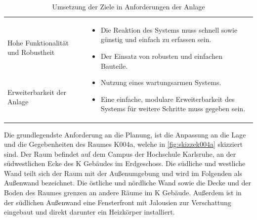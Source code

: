 \begin{table}[H]
\begin{tabularx}{1\textwidth}{m{}m{}}
& \multirow{3}{\hsize}{
\begin{minipage}[t]{0.57\textwidth}
\begin{itemize}[itemsep=0pt,topsep=0pt,leftmargin=5mm]
\item Die Reaktion des Systems muss schnell sowie günstig und einfach zu erfassen sein.
\item Der Einsatz von robusten und einfachen Bauteile.
\item Nutzung eines wartungsarmen Systems.
\item Eine einfache, modulare Erweiterbarkeit des Systems für weitere Schritte muss gegeben sein.
\end{itemize}
\end{minipage}
}  \\

\cmidrule[0.1pt](lr{2em}){1-1} 

Hohe Funktionalität und \newline Robustheit & \\

\cmidrule[0.1pt](lr{2em}){1-1} 

Erweiterbarkeit der Anlage
 &  \\

\bottomrule
\end{tabularx}
\caption{Umsetzung der Ziele in Anforderungen der Anlage}
\label{tab:anforderungen_umgebung}
\end{table}

Die grundlegendste Anforderung an die Planung, ist die Anpassung an die Lage und die Gegebenheiten des Raumes K004a, welche in \ref{fig:skizzek004a} skizziert sind. Der Raum befindet auf dem Campus der Hochschule Karlsruhe, an der südwestlichen Ecke des K Gebäudes im Erdgeschoss. Die südliche und westliche Wand teilt sich der Raum mit der Außenumgebung und wird im Folgenden als Außenwand bezeichnet. Die östliche und nördliche Wand sowie die Decke und der Boden des Raumes grenzen an andere Räume im K Gebäude. Außerdem ist in der südlichen Außenwand eine Fensterfront mit Jalousien zur Verschattung eingebaut und direkt darunter ein Heizkörper installiert.

